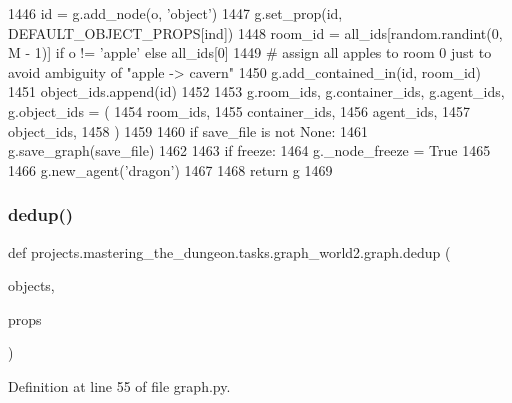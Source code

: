 \begin{DoxyCode}
1446             id = g.add\_node(o, \textcolor{stringliteral}{'object'})
1447             g.set\_prop(id, DEFAULT\_OBJECT\_PROPS[ind])
1448             room\_id = all\_ids[random.randint(0, M - 1)] \textcolor{keywordflow}{if} o != \textcolor{stringliteral}{'apple'} \textcolor{keywordflow}{else} all\_ids[0]
1449             \textcolor{comment}{# assign all apples to room 0 just to avoid ambiguity of "apple -> cavern"}
1450             g.add\_contained\_in(id, room\_id)
1451             object\_ids.append(id)
1452 
1453         g.room\_ids, g.container\_ids, g.agent\_ids, g.object\_ids = (
1454             room\_ids,
1455             container\_ids,
1456             agent\_ids,
1457             object\_ids,
1458         )
1459 
1460         \textcolor{keywordflow}{if} save\_file \textcolor{keywordflow}{is} \textcolor{keywordflow}{not} \textcolor{keywordtype}{None}:
1461             g.save\_graph(save\_file)
1462 
1463         \textcolor{keywordflow}{if} freeze:
1464             g.\_node\_freeze = \textcolor{keyword}{True}
1465 
1466         g.new\_agent(\textcolor{stringliteral}{'dragon'})
1467 
1468     \textcolor{keywordflow}{return} g
1469 \end{DoxyCode}
\mbox{\label{namespaceprojects_1_1mastering__the__dungeon_1_1tasks_1_1graph__world2_1_1graph_aacedda0df87e368472433505f6775190}} 
\subsubsection{\texorpdfstring{dedup()}{dedup()}}
{\footnotesize\ttfamily def projects.\+mastering\+\_\+the\+\_\+dungeon.\+tasks.\+graph\+\_\+world2.\+graph.\+dedup (\begin{DoxyParamCaption}\item[{}]{objects,  }\item[{}]{props }\end{DoxyParamCaption})}



Definition at line 55 of file graph.\+py.


